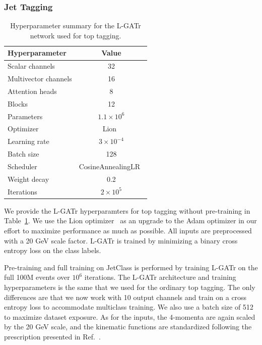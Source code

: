 \documentclass[submission, Phys]{SciPost}
\begin{document}

\subsubsection*{Jet Tagging}

\begin{table}[t]
    \centering
    \begin{tabular}{l c }
        \toprule
        Hyperparameter & Value\\[1mm]
        \midrule
        Scalar channels & 32 \\
        Multivector channels & 16 \\
        Attention heads & 8 \\
        Blocks & 12 \\        
        Parameters & $1.1 \times 10^6$\\
        \midrule
        Optimizer & Lion~\cite{chen2023symbolic} \\
        Learning rate & $3 \times 10^{-4}$ \\
        Batch size & 128 \\
        Scheduler & CosineAnnealingLR~\cite{DBLP:journals/corr/LoshchilovH16a} \\
        Weight decay & 0.2 \\      
        Iterations & $2 \times 10^5$\\
        \bottomrule
    \end{tabular}
    \caption{Hyperparameter summary for the L-GATr network used for top tagging.} 
    \label{tab:top_build}
\end{table}

We provide the L-GATr hyperparamters for top tagging without pre-training in Table~\ref{tab:top_build}. We use the Lion optimizer~\cite{chen2023symbolic} as an upgrade to the Adam optimizer in our effort to maximize performance as much as possible. All inputs are preprocessed with a 20 GeV scale factor. L-GATr is trained by minimizing a binary cross entropy loss on the class labels.

Pre-training and full training on JetClass is performed by training L-GATr on the full 100M events over $10^6$ iterations. The L-GATr architecture and training hyperparameters is the same that we used for the ordinary top tagging. The only differences are that we now work with 10 output channels and train on a cross entropy loss to accommodate multiclass training. We also use a batch size of 512 to maximize dataset exposure. As for the inputs, the 4-momenta are again scaled by the 20 GeV scale, and the kinematic functions are standardized following the prescription presented in Ref.~\cite{Qu:2022mxj}.
\end{document}
